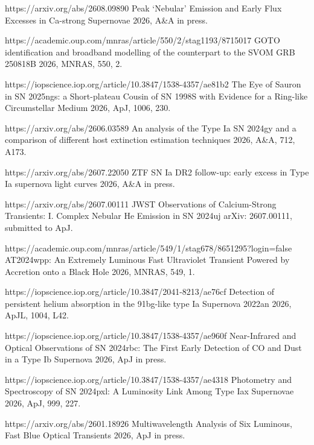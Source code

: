 \begin{cvpubs}
\begin{cvpubitems}
{}
{https://arxiv.org/abs/2608.09890}
{Peak `Nebular' Emission and Early Flux Excesses in Ca-strong Supernovae}
{2026, A\&A in press.}

{}
{https://academic.oup.com/mnras/article/550/2/stag1193/8715017}
{GOTO identification and broadband modelling of the counterpart to the SVOM GRB 250818B}
{2026, MNRAS, 550, 2.}

{}
{https://iopscience.iop.org/article/10.3847/1538-4357/ae81b2}
{The Eye of Sauron in SN 2025ngs: a Short-plateau Cousin of SN 1998S with Evidence for a Ring-like Circumstellar Medium}
{2026, ApJ, 1006, 230.}

{}
{https://arxiv.org/abs/2606.03589}
{An analysis of the Type Ia SN 2024gy and a comparison of different host extinction estimation techniques}
{2026, A\&A, 712, A173.}

{}
{https://arxiv.org/abs/2607.22050}
{ZTF SN Ia DR2 follow-up: early excess in Type Ia supernova light curves}
{2026, A\&A in press.}

{}
{https://arxiv.org/abs/2607.00111}
{JWST Observations of Calcium-Strong Transients: I. Complex Nebular He Emission in SN 2024uj}
{arXiv: 2607.00111, submitted to ApJ.}

{}
{https://academic.oup.com/mnras/article/549/1/stag678/8651295?login=false}
{AT2024wpp: An Extremely Luminous Fast Ultraviolet Transient Powered by Accretion onto a Black Hole}
{2026, MNRAS, 549, 1.}

{}
{https://iopscience.iop.org/article/10.3847/2041-8213/ae76cf}
{Detection of persistent helium absorption in the 91bg-like type Ia Supernova 2022an}
{2026, ApJL, 1004, L42.}

{}
{https://iopscience.iop.org/article/10.3847/1538-4357/ae960f}
{Near-Infrared and Optical Observations of SN 2024rbc: The First Early Detection of CO and Dust in a Type Ib Supernova}
{2026, ApJ in press.}

{}
{https://iopscience.iop.org/article/10.3847/1538-4357/ae4318}
{Photometry and Spectroscopy of SN 2024pxl: A Luminosity Link Among Type Iax Supernovae}
{2026, ApJ, 999, 227.}

{}
{https://arxiv.org/abs/2601.18926}
{Multiwavelength Analysis of Six Luminous, Fast Blue Optical Transients}
{2026, ApJ in press.}


\end{cvpubitems}
\end{cvpubs}
